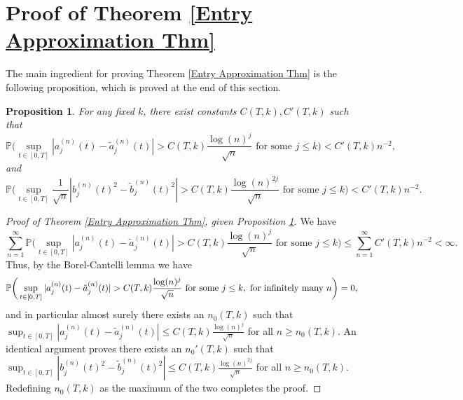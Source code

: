 \documentclass{amsart}
\newtheorem{prop}[thm]{Proposition}
\numberwithin{equation}{section}
\newcommand{\pr}{\mathbb{P}}
\begin{document}
\section{Proof of Theorem \ref{Entry Approximation Thm}}\label{Approximation Section}

The main ingredient for proving Theorem \ref{Entry Approximation Thm} is the following proposition, which is proved at the end of this section.  

\begin{prop}\label{Quantitative Approximation Probability }
For any fixed $k$, there exist constants $C(T,k), C'(T,k)$ such that
    \begin{equation*}
        \pr\bigg(\sup_{t \in [0,T]}|a_j^{(n)}(t)-\tilde{a}_j^{(n)}(t)|>C(T,k)\frac{\log(n)^j}{\sqrt{n}} \text{ for some } j\leq k\bigg) < C'(T,k)n^{-2},
    \end{equation*}
    and
    \begin{equation*}
        \pr\bigg(\sup_{t \in [0,T]} \frac{1}{\sqrt{n}}|b_j^{(n)}(t)^2-\tilde{b}_j^{(n)}(t)^2|>C(T,k)\frac{\log(n)^{2j}}{\sqrt{n}} \text{ for some } j \leq k\bigg) < C'(T,k)n^{-2}.
    \end{equation*}
\end{prop}

\begin{proof}[Proof of Theorem \ref{Entry Approximation Thm}, given Proposition \ref{Quantitative Approximation Probability }] 
We have 
\begin{equation*}
    \sum_{n=1}^{\infty}\pr\bigg(\sup_{t \in [0,T]}|a_j^{(n)}(t)-\tilde{a}_j^{(n)}(t)|>C(T,k)\frac{\log(n)^j}{\sqrt{n}} \text{ for some } j\leq k \bigg) \leq \sum_{n=1}^{\infty} C'(T,k) n^{-2} <\infty.
\end{equation*}
Thus, by the Borel-Cantelli lemma we have
\begin{equation*}
    \pr\bigg(\sup_{t \in [0,T]}|a_j^{(n)}(t)-\Tilde{a}_j^{(n)}(t)|>C(T,k)\frac{\log(n)^j}{\sqrt{n}} \text{ for some } j\leq k, \text{ for infinitely many }n \bigg) = 0,
\end{equation*}
and in particular almost surely there exists an $n_0(T,k)$ such that $\sup_{t \in [0,T]} |a_j^{(n)}(t)-\tilde{a}_j^{(n)}(t)|\leq C(T,k)\frac{\log(n)^j}{\sqrt{n}}$ for all $n \geq n_0(T,k)$. An identical argument proves there exists an $n_0'(T,k)$ such that $\sup_{t \in [0,T]}|b_j^{(n)}(t)^2-\tilde{b}_j^{(n)}(t)^2|\leq C(T,k)\frac{\log(n)^{2j}}{\sqrt{n}}$ for all $n \geq n_0(T,k)$. Redefining $n_0(T, k)$ as the maximum of the two completes the proof.
\end{proof}
\end{document}
